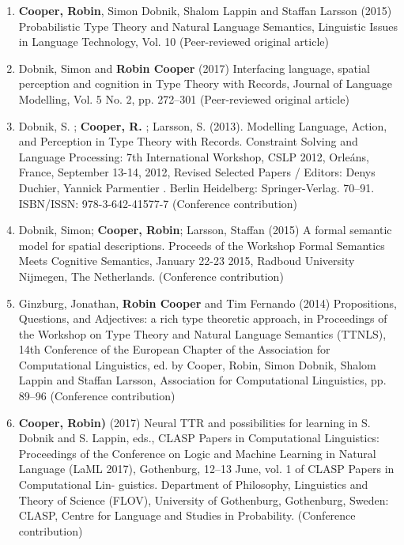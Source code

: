 \documentclass{article}
\begin{document}
\begin{enumerate}
\item  \textbf{Cooper, Robin}, Simon Dobnik, Shalom Lappin and Staffan Larsson (2015) Probabilistic Type Theory and Natural Language Semantics, Linguistic Issues in Language Technology, Vol. 10 (Peer-reviewed original article)

\item Dobnik, Simon and \textbf{Robin Cooper} (2017) Interfacing language, spatial perception and cognition in Type Theory with Records, Journal of Language Modelling, Vol. 5 No. 2, pp. 272–301 (Peer-reviewed original article)

\item Dobnik, S. ; \textbf{Cooper, R.} ; Larsson, S. (2013). Modelling Language, Action, and Perception in Type Theory with Records. Constraint Solving and Language Processing: 7th International Workshop, CSLP 2012, Orle\'ans, France, September 13-14, 2012, Revised Selected Papers / Editors: Denys Duchier, Yannick Parmentier . Berlin Heidelberg: Springer-Verlag. 70–91. ISBN/ISSN: 978-3-642-41577-7 (Conference contribution)

\item Dobnik, Simon; \textbf{Cooper, Robin}; Larsson, Staffan (2015) A formal semantic model for spatial descriptions. Proceeds of the Workshop Formal Semantics Meets Cognitive Semantics, January 22-23 2015, Radboud University Nijmegen, The Netherlands.  (Conference contribution)

\item Ginzburg, Jonathan, \textbf{Robin Cooper} and Tim Fernando (2014) Propositions, Questions, and Adjectives: a rich type theoretic approach, in Proceedings of the Workshop on Type Theory and Natural Language Semantics (TTNLS), 14th Conference of the European Chapter of the Association for Computational Linguistics, ed. by Cooper, Robin, Simon Dobnik, 
Shalom Lappin and Staffan Larsson, Association for Computational Linguistics, pp. 89–96  (Conference contribution)


\item \textbf{Cooper, Robin)} (2017) Neural TTR and possibilities for learning in S. Dobnik and S. Lappin, eds., CLASP Papers in Computational Linguistics: Proceedings of the Conference on Logic and Machine Learning in Natural Language (LaML 2017), Gothenburg, 12–13 June, vol. 1 of CLASP Papers in Computational Lin- guistics. Department of Philosophy, Linguistics and Theory of Science (FLOV), University of Gothenburg, Gothenburg, Sweden: CLASP, Centre for Language and Studies in Probability.  (Conference contribution)



\end{enumerate}
\end{document}
